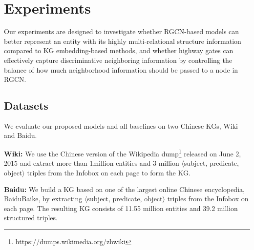 
	\section{Experiments}
	Our experiments are designed to investigate whether RGCN-based models can better represent an entity with its highly multi-relational structure information compared to KG embedding-based methods, and whether highway gates can effectively capture discriminative neighboring information by controlling the balance of how much neighborhood information should be passed to a node in RGCN.
	
	
	\subsection{Datasets}
	We evaluate our proposed models and all baselines on two Chinese KGs, Wiki and Baidu.
	
	\noindent \textbf{Wiki:} %
	We use the Chinese version of the Wikipedia dump\footnote{https://dumps.wikimedia.org/zhwiki} released on June 2, 2015 
	and extract more than 1million entities and 3 million $\langle$subject, predicate, object$\rangle$ triples from the Infobox on each page to form the KG.
	
	\noindent \textbf{Baidu:} We build a KG based on one of the largest online Chinese encyclopedia, BaiduBaike, 
	by extracting $\langle$subject, predicate, object$\rangle$ triples from the Infobox on each page. 
	The resulting KG consists of 11.55 million entities and 39.2 million structured triples. 
	
